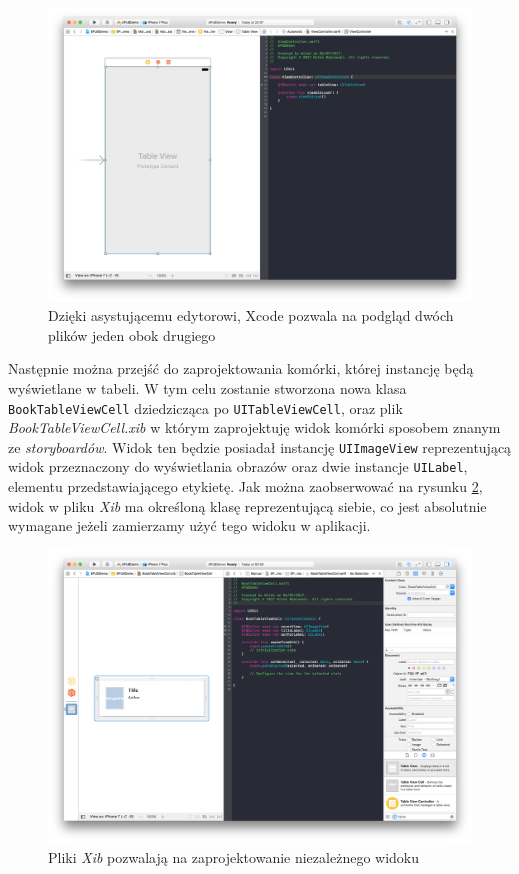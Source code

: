 \begin{figure}[ht!]
  \centering
  \includegraphics[width=120mm]{images/chapter-5-image-3-xcode-assistant.png}
  \caption{Dzięki asystującemu edytorowi, Xcode pozwala na podgląd dwóch plików jeden obok drugiego}
  \label{chapter-5-image-3-xcode-assistant}
\end{figure}

Następnie można przejść do zaprojektowania komórki, której instancję będą wyświetlane w tabeli. W tym celu zostanie stworzona nowa klasa \texttt{BookTableViewCell} dziedzicząca po \texttt{UITableViewCell}, oraz plik \textit{BookTableViewCell.xib} w którym zaprojektuję widok komórki sposobem znanym ze \textit{storyboardów}. Widok ten będzie posiadał instancję \texttt{UIImageView} reprezentującą widok przeznaczony do wyświetlania obrazów oraz dwie instancje \texttt{UILabel}, elementu przedstawiającego etykietę. Jak można zaobserwować na rysunku \ref{chapter-5-image-4-book-cell}, widok w pliku \textit{Xib} ma określoną klasę reprezentującą siebie, co jest absolutnie wymagane jeżeli zamierzamy użyć tego widoku w aplikacji.

\begin{figure}[ht!]
  \centering
  \includegraphics[width=120mm]{images/chapter-5-image-4-book-cell.png}
  \caption{Pliki \textit{Xib} pozwalają na zaprojektowanie niezależnego widoku}
  \label{chapter-5-image-4-book-cell}
\end{figure}

